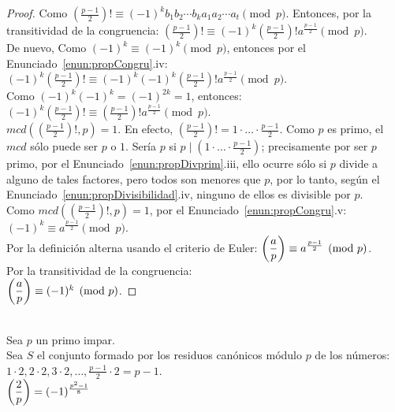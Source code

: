 \begin{proof}
Como $\left(\frac{p-1}{2}\right)! \equiv (-1)^kb_{1}b_{2}\cdots b_{k}a_{1}a_{2}\cdots a_{t} \pmod{p}$. Entonces, por la transitividad de la congruencia: $\left(\frac{p-1}{2}\right)! \equiv (-1)^{k}\left(\frac{p-1}{2}\right)! a^{\frac{p-1}{2}} \pmod{p}$. \\
De nuevo, 
Como $(-1)^k \equiv (-1)^k \pmod p$, entonces por el  Enunciado~\ref{enun:propCongru}.iv: \\
$(-1)^k\left(\frac{p-1}{2}\right)! \equiv (-1)^k(-1)^{k}\left(\frac{p-1}{2}\right)! a^{\frac{p-1}{2}} \pmod{p}$. \\
Como $(-1)^k(-1)^k = (-1)^{2k} = 1$, entonces: \\
$(-1)^k\left(\frac{p-1}{2}\right)! \equiv \left(\frac{p-1}{2}\right)! a^{\frac{p-1}{2}} \pmod{p}$. \\
$mcd(\left(\frac{p-1}{2}\right)!,p)=1$. En efecto, $\left(\frac{p-1}{2}\right)! = 1\cdot \ldots \cdot \frac{p-1}{2}$. Como $p$ es primo, el $mcd$ sólo puede ser $p$ o $1$. Sería $p$ si $p \mid (1\cdot \ldots \cdot \frac{p-1}{2})$; precisamente por ser $p$ primo, por el Enunciado~\ref{enun:propDivprim}.iii, ello ocurre sólo si $p$ divide a alguno de tales factores, pero todos son menores que $p$, por lo tanto, según el Enunciado~\ref{enun:propDivisibilidad}.iv, ninguno de ellos es divisible por $p$. \\
Como $mcd(\left(\frac{p-1}{2}\right)!,p)=1$, por el Enunciado~\ref{enun:propCongru}.v: \\
$(-1)^k \equiv a^{\frac{p-1}{2}} \pmod{p}$. \\
Por la definición alterna usando el criterio de Euler:
$\left(\dfrac{a}{p}\right) \equiv a^{\frac{p-1}{2}} \pmod{p}$. \\
Por la transitividad de la congruencia: \\
$\left(\dfrac{a}{p}\right) \equiv (-1)^k \pmod{p}$.
\end{proof}

\begin{enunciado} \, \\
Sea $p$ un primo impar. \\
Sea $S$ el conjunto formado por los residuos canónicos módulo $p$ de los números: \\
$1\cdot2, 2\cdot2, 3\cdot2, \dots, \frac{p-1}{2}\cdot2=p-1$. \\
$\left(\dfrac{2}{p}\right) = (-1)^{\frac{p^2-1}{8}}$
\end{enunciado}

